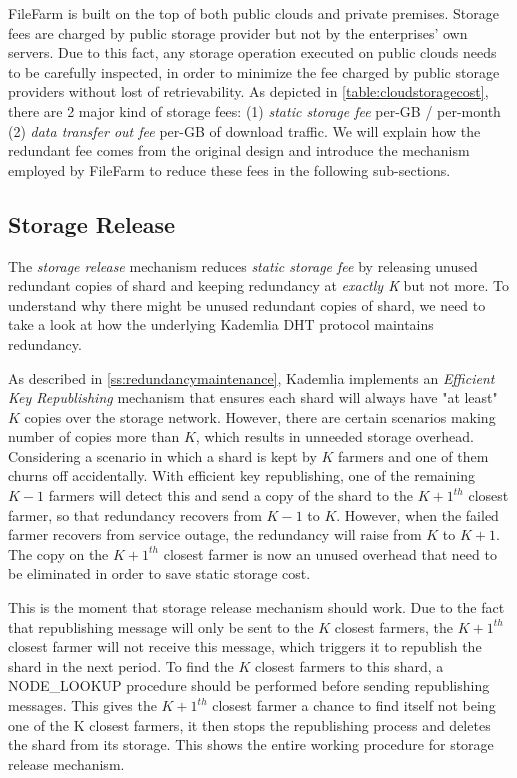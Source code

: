 FileFarm is built on the top of both public clouds and private premises. Storage fees are charged by public storage provider but not by the enterprises' own servers. Due to this fact, any storage operation executed on public clouds needs to be carefully inspected, in order to minimize the fee charged by public storage providers without lost of retrievability. As depicted in \ref{table:cloudstoragecost}, there are 2 major kind of storage fees: (1) \textit{static storage fee} per-GB / per-month (2) \textit{data transfer out fee} per-GB of download traffic. We will explain how the redundant fee comes from the original design and introduce the mechanism employed by FileFarm to reduce these fees in the following sub-sections.

\subsection{Storage Release}
\label{ss:storagerelease}

The \textit{storage release} mechanism reduces \textit{static storage fee} by releasing unused redundant copies of shard and keeping redundancy at \textit{exactly K} but not more. To understand why there might be unused redundant copies of shard, we need to take a look at how the underlying Kademlia DHT protocol maintains redundancy.

As described in \ref{ss:redundancymaintenance}, Kademlia implements an \textit{Efficient Key Republishing} mechanism that ensures each shard will always have "at least" $K$ copies over the storage network. However, there are certain scenarios making number of copies more than $K$, which results in unneeded storage overhead. Considering a scenario in which a shard is kept by $K$ farmers and one of them churns off accidentally. With efficient key republishing, one of the remaining $K-1$
farmers will detect this and send a copy of the shard to the $K+1^{th}$ closest farmer, so that redundancy recovers from $K-1$ to $K$. However, when the failed farmer recovers from service outage, the redundancy will raise from $K$ to $K+1$. The copy on the $K+1^{th}$ closest farmer is now an unused overhead that need to be eliminated in order to save static storage cost.

This is the moment that storage release mechanism should work. Due to the fact that republishing message will only be sent to the $K$ closest farmers, the $K+1^{th}$ closest farmer will not receive this message, which triggers it to republish the shard in the next period. To find the $K$ closest farmers to this shard, a NODE\_LOOKUP procedure should be performed before sending republishing messages. This gives the $K+1^{th}$ closest farmer a chance to find itself not being one of the K closest farmers, it then stops the republishing process and deletes the shard from its storage. This shows the entire working procedure for storage release mechanism.

